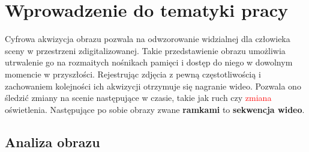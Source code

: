 \chapter{Wprowadzenie do tematyki pracy}
\label{cha:tematykaPracy}
Cyfrowa akwizycja obrazu pozwala na odwzorowanie widzialnej dla człowieka sceny w przestrzeni zdigitalizowanej. Takie przedstawienie obrazu umożliwia utrwalenie go na rozmaitych nośnikach pamięci i dostęp do niego w dowolnym momencie w przyszłości. Rejestrując zdjęcia z pewną częstotliwością i zachowaniem kolejności ich akwizycji otrzymuje się nagranie wideo. Pozwala ono śledzić zmiany na scenie następujące w czasie, takie jak ruch czy \textcolor{red}{zmiana} oświetlenia. Następujące po sobie obrazy zwane \textbf{ramkami} to \textbf{sekwencja wideo}.

\section{Analiza obrazu}  
